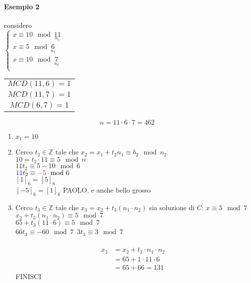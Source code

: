     \paragraph{Esempio 2} considero\\

    $
    \begin{cases}
        x\equiv 10\mod \underset{n_1}{11} \\
        x\equiv 5\mod \underset{n_2}{6} \\
        x\equiv 10\mod \underset{n_3}{7} \\
    \end{cases}
    $
    \begin{tabular}{c}
        $MCD(11,6)=1$\\
        $MCD(11,7)=1$\\
        $MCD(6,7)=1$
    \end{tabular}
    $$n=11\cdot 6\cdot 7= 462$$
    \begin{enumerate}
        \item $x_1=10$
        \item Cerco $t_2\in\mathbb{Z}$ tale che $x_2=x_1+t_2n_1\equiv b_2\mod n_2$\\
            $10=t_2\cdot 11\equiv 5\mod n$\\
            $11t_2\equiv 5-10 \mod 6$\\
            ${\color{blue}11}t_2\equiv {\color{red}-5} \mod 6$\\
            {\tiny
            {\color{blue}$[1]_6=[5]_6$}\\
            {\color{red}$[-5]_6=[1]_6$}
            }
            {\color{purple}PAOLO, e anche bello grosso}
        \item Cerco $t_3\in\mathbb{Z}$ tale che  $x_3=x_2+t_3(n_1\cdot n_2)$ 
            sia soluzione di $C$: $x\equiv 5\mod 7$\\
            $x_2+t_3(n_1\cdot n_2)\equiv 5\mod 7$\\
            $65+t_3(11\cdot 6)\equiv 5\mod 7 $\\
            $66t_3\equiv -60\mod 7 $\
            $3t_3\equiv 3\mod 7$\\\\
            \begin{align*}
                x_3 & =x_2+t_3\cdot n_1\cdot n_2\\
                    & =65+1\cdot 11\cdot 6\\
                    & =65+66=131
            \end{align*}
            FINISCI
    \end{enumerate}
